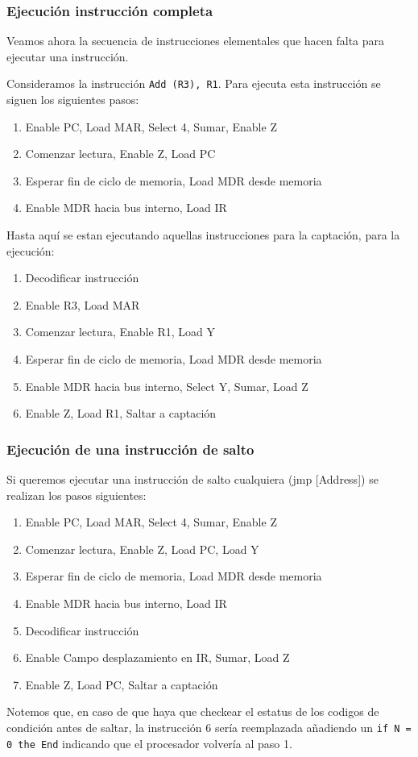 \subsubsection{Ejecución instrucción completa}
Veamos ahora la secuencia de instrucciones elementales que hacen falta para ejecutar una instrucción.
\begin{ejemplo}
    Consideramos la instrucción \texttt{Add (R3), R1}. Para ejecuta esta instrucción se siguen los siguientes pasos:
    \begin{enumerate}
        \item Enable PC, Load MAR, Select 4, Sumar, Enable Z
        \item Comenzar lectura, Enable Z, Load PC
        \item Esperar fin de ciclo de memoria, Load MDR desde memoria
        \item Enable MDR hacia bus interno, Load IR
    \end{enumerate}
    Hasta aquí se estan ejecutando aquellas instrucciones para la captación, para la ejecución:
    \begin{enumerate}
        \item Decodificar instrucción
        \item Enable R3, Load MAR
        \item Comenzar lectura, Enable R1, Load Y
        \item Esperar fin de ciclo de memoria, Load MDR desde memoria
        \item Enable MDR hacia bus interno, Select Y, Sumar, Load Z
        \item Enable Z, Load R1, Saltar a captación
    \end{enumerate}
\end{ejemplo}
\subsubsection{Ejecución de una instrucción de salto}
Si queremos ejecutar una instrucción de salto cualquiera (jmp [Address]) se realizan los pasos siguientes: 
\begin{enumerate}
    \item Enable PC, Load MAR, Select 4, Sumar, Enable Z
    \item Comenzar lectura, Enable Z, Load PC, Load Y
    \item Esperar fin de ciclo de memoria, Load MDR desde memoria
    \item Enable MDR hacia bus interno, Load IR
    \item Decodificar instrucción
    \item Enable Campo desplazamiento en IR, Sumar, Load Z
    \item Enable Z, Load PC, Saltar a captación
\end{enumerate}
Notemos que, en caso de que haya que checkear el estatus de los codigos de condición antes de saltar,
la instrucción 6 sería reemplazada añadiendo un \texttt{if N = 0 the End} indicando que el procesador volvería al paso 1.
